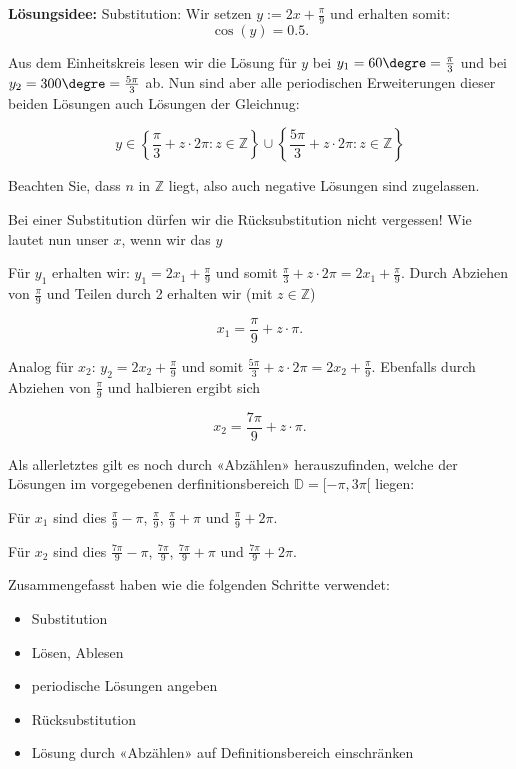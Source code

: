 \newpage


\textbf{Lösungsidee:} Substitution:
Wir setzen $y := 2x + \frac{\pi}{9}$ und erhalten somit:
$$\cos(y) = 0.5.$$

Aus dem Einheitskreis lesen wir die Lösung für $y$ bei $y_1=60\degre = \frac{\pi}{3}$ und bei $y_2=300\degre = \frac{5\pi}{3}$ ab. Nun sind aber alle periodischen Erweiterungen dieser beiden Lösungen auch Lösungen der Gleichnug:

$$y \in \left\{\frac{\pi}{3} + z\cdot{}2\pi: z\in\mathbb{Z}\right\} \cup \left\{\frac{5\pi}{3}+ z\cdot{}2\pi: z\in\mathbb{Z}\right\}$$

Beachten Sie, dass $n$ in $\mathbb{Z}$ liegt, also auch negative Lösungen sind zugelassen.

Bei einer Substitution dürfen wir die Rücksubstitution nicht vergessen! Wie lautet nun unser $x$, wenn wir das $y$ 

Für $y_1$ erhalten wir: $y_1= 2x_1 + \frac{\pi}{9}$ und somit $\frac{\pi}{3} + z\cdot{}2\pi = 2x_1 + \frac{\pi}{9}$. Durch Abziehen von $\frac{\pi}{9}$ und Teilen durch 2 erhalten wir (mit $z\in\mathbb{Z}$)

$$x_1 = \frac{\pi}{9} + z\cdot{}\pi.$$

Analog für $x_2$: $y_2 = 2x_2 + \frac{\pi}{9}$ und somit $\frac{5\pi}{3} + z\cdot{}2\pi = 2x_2 + \frac{\pi}{9}$. Ebenfalls durch Abziehen von $\frac{\pi}{9}$ und halbieren ergibt sich

$$x_2 = \frac{7\pi}{9} + z\cdot{}\pi.$$

Als allerletztes gilt es noch durch «Abzählen» herauszufinden, welche der Lösungen im vorgegebenen derfinitionsbereich $\mathbb{D} = [-\pi, 3\pi[$ liegen:

    Für $x_1$ sind dies $\frac{\pi}{9} - \pi$, $\frac{\pi}{9}$, $\frac{\pi}{9} + \pi$ und $\frac{\pi}{9} + 2\pi$.

    Für $x_2$ sind dies $\frac{7\pi}{9} - \pi$, $\frac{7\pi}{9}$, $\frac{7\pi}{9} + \pi$ und $\frac{7\pi}{9} + 2\pi$.
   
    Zusammengefasst haben wie die folgenden Schritte verwendet:
    \begin{rezept}{}{}
\begin{itemize}
    \item Substitution
    \item Lösen, Ablesen
    \item periodische Lösungen angeben
    \item Rücksubstitution
    \item Lösung durch «Abzählen» auf Definitionsbereich einschränken
\end{itemize}
\end{rezept}
\newpage

